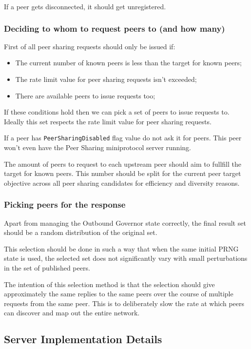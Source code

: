 If a peer gets disconnected, it should get unregistered.

\subsubsection{Deciding to whom to request peers to (and how many)}

First of all peer sharing requests should only be issued if:

\begin{itemize}
  \item The current number of known peers is less than the target for known peers;
  \item The rate limit value for peer sharing requests isn't exceeded;
  \item There are available peers to issue requests too;
\end{itemize}

If these conditions hold then we can pick a set of peers to issue requests to.
Ideally this set respects the rate limit value for peer sharing requests.

If a peer has \texttt{PeerSharingDisabled} flag value do not ask it for peers.
This peer won't even have the Peer Sharing miniprotocol server running.

The amount of peers to request to each upstream peer should aim to fullfill
the target for known peers. This number should be split for the current peer
target objective across all peer sharing candidates for efficiency and
diversity reasons.

\subsubsection{Picking peers for the response}

Apart from managing the Outbound Governor state correctly, the final result
set should be a random distribution of the original set.

This selection should be done in such a way that when the same initial PRNG
state is used, the selected set does not significantly vary with small
perturbations in the set of published peers.

The intention of this selection method is that the selection should give
approximately the same replies to the same peers over the course of multiple
requests from the same peer. This is to deliberately slow the rate at which
peers can discover and map out the entire network.

\subsection{Server Implementation Details}

